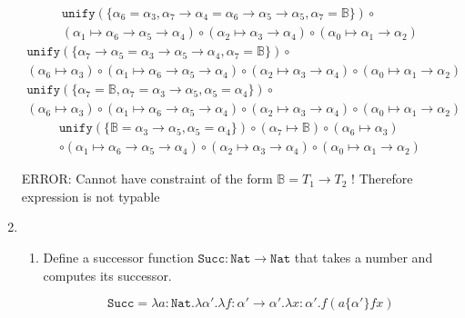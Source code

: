 \documentclass[11pt]{article}
\newcommand{\B}{\mathbb{B}}
\newcommand{\N}{\texttt{Nat}}
\newcommand{\U}{\texttt{unify}}
\newcommand{\rarr}{\rightarrow}
\begin{document}
\begin{enumerate}
	\begin{multline}
		\U( \{ \alpha_6 = \alpha_3, \alpha_7 \rarr \alpha_4 = \alpha_6 \rarr \alpha_5 \rarr \alpha_5, \alpha_7 = \B \} ) \circ \\ ( \alpha_1 \mapsto \alpha_6 \rarr \alpha_5 \rarr \alpha_4) \circ ( \alpha_2 \mapsto \alpha_3 \rarr \alpha_4) \circ ( \alpha_0 \mapsto \alpha_1 \rarr \alpha_2) 
	\end{multline}
	\begin{multline}
		\U( \{ \alpha_7 \rarr \alpha_5 = \alpha_3 \rarr \alpha_5 \rarr \alpha_4, \alpha_7 = \B \}  ) \circ \\
		( \alpha_6 \mapsto \alpha_3) \circ  ( \alpha_1 \mapsto \alpha_6 \rarr \alpha_5 \rarr \alpha_4) \circ ( \alpha_2 \mapsto \alpha_3 \rarr \alpha_4) \circ ( \alpha_0 \mapsto \alpha_1 \rarr \alpha_2) 
	\end{multline}
	\begin{multline}
		\U( \{ \alpha_7 = \B, \alpha_7 = \alpha_3 \rarr \alpha_5, \alpha_5 = \alpha_4 \} ) \circ \\ 
			( \alpha_6 \mapsto \alpha_3) \circ  ( \alpha_1 \mapsto \alpha_6 \rarr \alpha_5 \rarr \alpha_4) \circ ( \alpha_2 \mapsto \alpha_3 \rarr \alpha_4) \circ ( \alpha_0 \mapsto \alpha_1 \rarr \alpha_2) 
	\end{multline}
	\begin{multline}
		\U( \{ \B = \alpha_3 \rarr \alpha_5, \alpha_5 = \alpha_4 \} ) \circ ( \alpha_7 \mapsto \B) \circ ( \alpha_6 \mapsto \alpha_3) \\
			\circ  ( \alpha_1 \mapsto \alpha_6 \rarr \alpha_5 \rarr \alpha_4) \circ ( \alpha_2 \mapsto \alpha_3 \rarr \alpha_4) \circ ( \alpha_0 \mapsto \alpha_1 \rarr \alpha_2) 
	\end{multline}

	\color{red}
	ERROR: Cannot have constraint of the form $\B = T_1 \rarr T_2$ ! Therefore expression is not typable 

	\color{black}
\item 
	\begin{enumerate}

		\item 

			Define a successor function $ \texttt{Succ}: \N \rarr \N$ that takes a number and computes its successor.

			\begin{equation*}
				\texttt{Succ} = \lambda a:\N. \lambda \alpha'. \lambda f: \alpha' \rarr \alpha' . \lambda x: \alpha' . f(a \{ \alpha' \} fx)
			\end{equation*}


\end{enumerate}
\end{enumerate}
\end{document}
